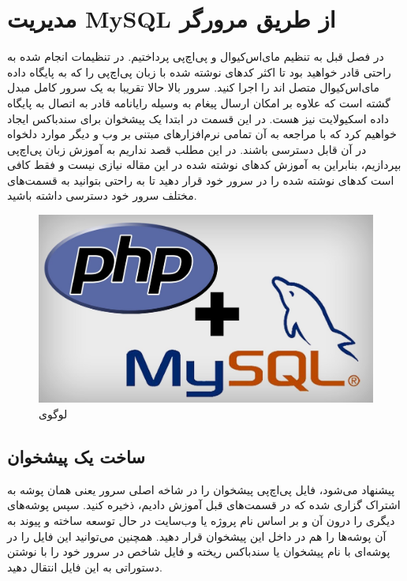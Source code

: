 \chapter{مدیریت MySQL از طریق مرورگر}
در فصل قبل به تنظیم مای‌اس‌کیوال و پی‌اچ‌پی پرداختیم. در تنظیمات انجام شده به راحتی قادر خواهید بود تا اکثر کدهای نوشته شده با زبان پی‌اچ‌پی را که به پایگاه داده مای‌اس‌کیوال متصل اند را اجرا کنید. سرور بالا حالا تقریبا به یک سرور کامل مبدل گشته است که علاوه بر امکان ارسال پیغام به وسیله رایانامه قادر به اتصال به پایگاه داده  اسکیو‌لایت نیز هست. در این قسمت در ابتدا یک پیشخوان برای سندباکس ایجاد خواهیم کرد که با مراجعه به آن تمامی نرم‌افزارهای مبتنی بر وب و دیگر موارد دلخواه در آن قابل دسترسی باشند. در این مطلب قصد نداریم به آموزش زبان پی‌اچ‌پی بپردازیم، بنابراین به آموزش کدهای نوشته شده در این مقاله نیازی نیست و فقط کافی است کدهای نوشته شده را در سرور خود قرار دهید تا به راحتی بتوانید به قسمت‌های مختلف سرور خود دسترسی داشته باشید.
\begin{figure}
    \includegraphics[width=.9\textwidth ,height=.65\textwidth]{Pic/PHP-MYSQL}
    \caption{ لوگوی 
    }
    \label{MYSQL-PHP}
\end{figure}
\section{ساخت یک پیشخوان}
پیشنهاد می‌شود، فایل پی‌اچ‌پی پیشخوان را در شاخه اصلی سرور یعنی همان پوشه به اشتراک گزاری شده که در قسمت‌های قبل آموزش دادیم، ذخیره کنید. سپس پوشه‌های دیگری را درون آن و بر اساس نام پروژه یا وب‌سایت در حال توسعه ساخته و پیوند به آن پوشه‌ها را هم در داخل این پیشخوان قرار دهید. همچنین می‌توانید این فایل را در پوشه‌ای با نام پیشخوان یا سندباکس ریخته و فایل شاخص در سرور خود را با نوشتن دستوراتی به این فایل انتقال دهید.

